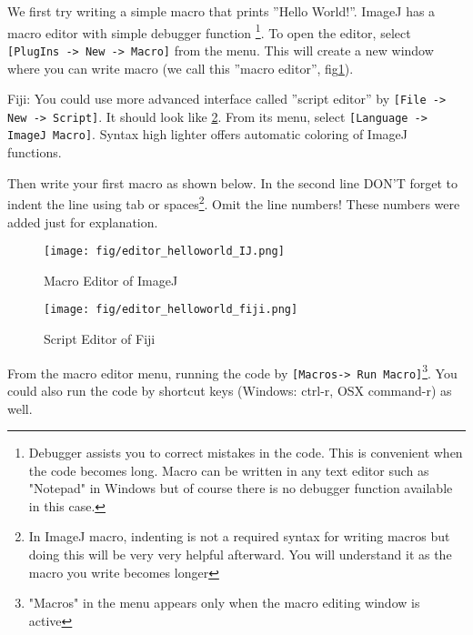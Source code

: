 \documentclass[11pt,a4paper,oneside]{report}
\newenvironment{indentFiji}%
{\begin{list}{}%
         {\setlength{\leftmargin}{1em}}%
         \item[]%
}
{\end{list}}
\newcommand{\ijmenu}[1]{\texttt{\small#1}}
\begin{document}
We first try writing a simple macro that prints ''Hello World!''. 
ImageJ has a macro editor with simple debugger function
\footnote{Debugger assists you to correct mistakes in the code. 
This is convenient when the code becomes long. 
Macro can be written in any text editor such as "Notepad" in Windows but of course 
there is no debugger function available in this case.}. 
To open the editor, select \ijmenu{[PlugIns -> New -> Macro]} from the menu.  
This will create a new window where you can write macro (we call this ''macro
editor'', fig\ref{fig_MacroEditor}).
\begin{indentFiji}
Fiji: You could use more advanced interface called ''script editor'' 
by \ijmenu{[File -> New -> Script]}. It should look like \ref{fig_ScriptEditor}. 
From its menu, select \ijmenu{[Language -> ImageJ Macro]}. 
Syntax high lighter offers automatic coloring of ImageJ functions. 
\end{indentFiji}
Then write your first macro as shown below. In the second line DON'T forget to
indent the line using tab or spaces\footnote{In ImageJ macro, indenting is not a required
syntax for writing macros but doing this will be very very helpful afterward. You
will understand it as the macro you write becomes longer}. Omit the line
numbers! These numbers were added just for explanation.


%


\begin{figure}[htbp]
\begin{center}
\texttt{[image: fig/editor\_helloworld\_IJ.png]}
\caption{Macro Editor of ImageJ} \label{fig_MacroEditor}
\end{center}
\end{figure}

\begin{figure}[htbp]
\begin{center}
\texttt{[image: fig/editor\_helloworld\_fiji.png]}
\caption{Script Editor of Fiji} \label{fig_ScriptEditor}
\end{center}
\end{figure}

From the macro editor menu, running the code by \ijmenu{[Macros->
Run Macro]}\footnote{"Macros" in the menu appears only when the macro editing
window is active}. You could also run the code by shortcut keys (Windows:
ctrl-r, OSX command-r) as well. 
 
\end{document}

